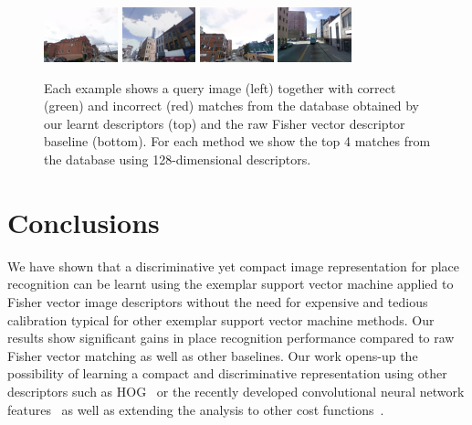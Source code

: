 \documentclass[10pt,twocolumn,letterpaper]{article}
\begin{document}
\begin{figure}[t!]
\begin{minipage}{0.75\linewidth}
\begin{minipage}{\linewidth}
               \end{minipage}
               \\
               \begin{minipage}{\linewidth}
                   \colorbox{myRed}{\includegraphics[height=16mm]{imgs/ex4/FV1.jpg}}
                   \colorbox{myGreen}{\includegraphics[height=16mm]{imgs/ex4/FV2.jpg}}
                   \colorbox{myRed}{\includegraphics[height=16mm]{imgs/ex4/FV3.jpg}}
                   \colorbox{myRed}{\includegraphics[height=16mm]{imgs/ex4/FV4.jpg}}
               \end{minipage} 
            \end{minipage}
            \caption{
               Each example shows a query image (left) together with correct (green) and incorrect (red) matches from the database obtained by our learnt descriptors (top) and the raw Fisher vector descriptor baseline (bottom). For each method we show the top 4 matches from the database using 128-dimensional descriptors.        
            }
            \label{fig:images}
         \end{figure}
   \section{Conclusions}
      We have shown that a discriminative yet compact image representation for place recognition can be learnt using the exemplar support vector machine applied to Fisher vector image descriptors without the need for expensive and tedious calibration typical for other exemplar support vector machine methods. Our results show significant gains in place recognition performance compared to raw Fisher vector matching as well as other baselines. Our work opens-up the possibility of learning a compact and discriminative representation using other descriptors such as HOG~\cite{Dalal05} or the recently developed convolutional neural network features~\cite{Donahue13,Krizhevsky12,Oquab14,Sermanet13} as well as extending the analysis to other cost functions~\cite{Gharbi12,Hariharan12}. 

\small{
   
   
}
\end{document}
